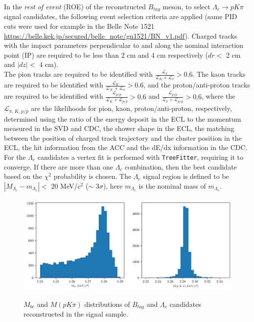 In the \textit{rest of event} (ROE) of the reconstructed $B_{tag}$ meson, to select $\Lambda_c \rightarrow p  K \pi$ signal candidates, the following event selection criteria are applied (same PID cuts were used for example in the Belle Note 1521 \url{https://belle.kek.jp/secured/belle_note/gn1521/BN_v1.pdf}). 
Charged tracks with the impact parameters perpendicular to and along the nominal interaction point (IP) are required to be less than 2 cm and 4 cm respectively ($dr <$ 2 cm and $|dz| <$ 4 cm).\\
The pion tracks are required to be identified with $\frac{\mathcal{L_{\pi}}}{\mathcal{L}_{K}+\mathcal{L_{\pi}}} > 0.6$. The kaon tracks are required to be identified with $\frac{\mathcal{L}_{K}}{\mathcal{L_{K}}+\mathcal{L_{\pi}}} > 0.6$, and the proton/anti-proton tracks are required to be identified with  
$\frac{\mathcal{L}_{p/\bar{p}}}{\mathcal{L}_{K}+\mathcal{L}_{p/\bar{p}}} > 0.6$ and $\frac{\mathcal{L}_{p/\bar{p}}}{\mathcal{L}_{\pi}+\mathcal{L}_{p/\bar{p}}} > 0.6$, where the $\mathcal{L}_{\pi ,} {}_{K,} {}_{p/\bar{p}}$ are the likelihoods for pion, kaon, proton/anti-proton, respectively, determined using the ratio of the energy deposit in the ECL to the momentum measured in the SVD and CDC, the shower shape in the ECL, the matching between the position of charged
track trajectory and the cluster position in the ECL, the hit information from the
ACC and the dE/dx information in the CDC. \\
For the $\Lambda_c$ candidates a vertex fit is performed with \texttt{TreeFitter}, requiring it to converge.  If there are more than one $\Lambda_c$ combination, then the best candidate based on the $\chi^2$ probability is chosen. The $\Lambda_c$ signal region is defined to be $|M_{\Lambda_c} - m_{\Lambda_c}| < $   20  MeV/$c^2$ ($\sim$ 3$\sigma$), here $m_{\Lambda_c}$ is the nominal mass of $m_{\Lambda_c}$.\\



\begin{figure}[H]
{\includegraphics[width=1.0\textwidth]{03-Selection/figs/chargedBcorr_Mbc_MpKpi_TotalSignal.png}}
\caption{$M_{bc}$ and $M(p K \pi)$ distributions of $B_{tag}$ and $\Lambda_c$ candidates reconstructed in the signal sample.}
\label{fig:chargedBcorr_Mbc_MpKpi_TotalSignal}
\end{figure}

